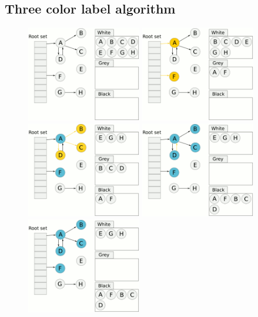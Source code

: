 \documentclass[a4paper]{exam}
\theoremstyle{definition}
\begin{document}
\subsection{Three color label algorithm}
\begin{figure}[htbp]
  \centering
  \includegraphics[width=5cm]{./img/tri_1.png}
  \includegraphics[width=5cm]{./img/tri_2.png}
  \includegraphics[width=5cm]{./img/tri_3.png}
  \includegraphics[width=5cm]{./img/tri_4.png}
  \includegraphics[width=5cm]{./img/tri_5.png}

\end{figure}
\end{document}
